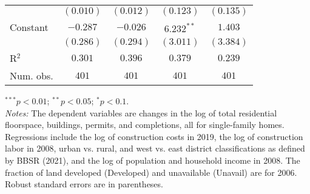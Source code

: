 \begin{table}
\begin{center}
\begin{footnotesize}
\begin{threeparttable}
\begin{tabular}{l c c c c}
                                     & $(0.010)$      & $(0.012)$      & $(0.123)$      & $(0.135)$      \\
Constant                             & $-0.287$       & $-0.026$       & $6.232^{**}$   & $1.403$        \\
                                     & $(0.286)$      & $(0.294)$      & $(3.011)$      & $(3.384)$      \\
\midrule
R$^2$                                & $0.301$        & $0.396$        & $0.379$        & $0.239$        \\
Num. obs.                            & $401$          & $401$          & $401$          & $401$          \\
\bottomrule
\end{tabular}
\begin{tablenotes}[flushleft]
\tiny{\item $^{***}p<0.01$; $^{**}p<0.05$; $^{*}p<0.1$. \\ \textit{Notes:} The dependent variables are changes in the log of total residential floorspace, buildings, permits, and completions, all for single-family homes. Regressions include the log of construction costs in 2019, the log of construction labor in 2008, urban vs. rural, and west vs. east district classifications as defined by BBSR (2021), and the log of population and household income in 2008. The fraction of land developed (Developed) and unavailable (Unavail) are for 2006. Robust standard errors are in parentheses.}
\end{tablenotes}
\end{threeparttable}
\end{footnotesize}
\label{tbl-ols-results-single-family-checked}
\end{center}
\end{table}

